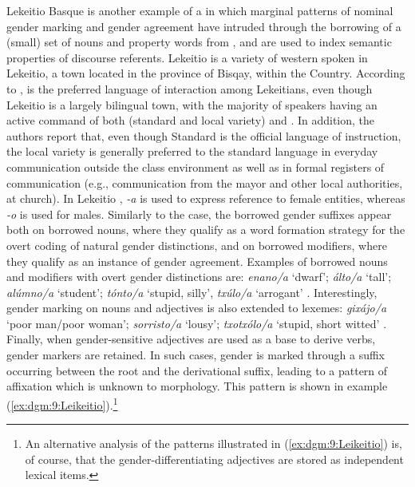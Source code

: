 \documentclass[output=collectionpaper]{langsci/langscibook}
\begin{document}
Lekeitio Basque is another example of a 
 in which marginal patterns of nominal gender marking and gender agreement have intruded through the borrowing of a (small) set of nouns and property words from , and are used to index semantic properties of discourse referents. Lekeitio  is a variety of western  spoken in Lekeitio, a town located in the province of Bisqay, within the   Country. According to \citet[1--2]{Hualde1994},  is the preferred language of interaction among Lekeitians, even though Lekeitio is a largely bilingual town, with the majority of speakers having an active command of both  (standard and local variety) and . In addition, the authors report that, even though Standard  is the official language of instruction, the local variety is generally preferred to the standard language in everyday communication outside the class environment as well as in formal registers of communication (e.g., communication from the mayor and other local authorities, at church). In Lekeitio , \textit{-a} is used to express reference to female entities, whereas \textit{-o} is used for males. Similarly to the  case, the borrowed gender suffixes appear both on borrowed nouns, where they qualify as a word formation strategy for the overt coding of natural gender distinctions, and on borrowed modifiers, where they qualify as an instance of gender agreement. Examples of borrowed nouns and modifiers with overt gender distinctions are: \textit{enano/a} `dwarf'; \textit{\'alto/a} `tall'; \textit{al\'umno/a} `student'; \textit{t\'onto/a} `stupid, silly', \textit{tx\'ulo/a} `arrogant' \citep[108--109]{Hualde1994}. Interestingly, gender marking on nouns and adjectives is also extended to  lexemes: \textit{gix\'ajo/a} `poor man/poor woman'; \textit{sorristo/a} `lousy'; \textit{txotx\'olo/a} `stupid, short witted' \citep[109]{Hualde1994}. Finally, when gender-sensitive adjectives are used as a base to derive verbs, gender markers are retained. In such cases, gender is marked through a suffix occurring between the root and the derivational suffix, leading to a pattern of affixation which is unknown to  morphology. This pattern is shown in example (\ref{ex:dgm:9:Leikeitio}).\footnote{An alternative analysis of the patterns illustrated in (\ref{ex:dgm:9:Leikeitio}) is, of course, that the gender-differentiating adjectives are stored as independent lexical items.}
\end{document}
